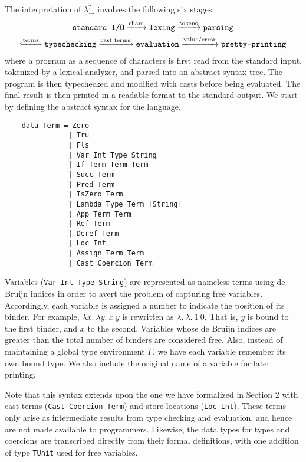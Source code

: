 The interpretation of $\lambda ^? _{\rightarrow}$ involves the following 
six stages:
\begin{gather*}
    \texttt{standard I/O} \xrightarrow{\text{chars}}
    \texttt{lexing} \xrightarrow{\text{tokens}} \texttt{parsing} \\
    \lhook\joinrel\xrightarrow{\text{terms}} \texttt{typechecking} 
    \xrightarrow{\text{cast terms}} \texttt{evaluation} 
    \xrightarrow{\text{value}/\text{error}} \texttt{pretty-printing}
\end{gather*}
where a program as a sequence of characters is first read from the 
standard input, tokenized by a lexical analyzer, and parsed into 
an abstract syntax tree. The program is then typechecked and 
modified with casts before being evaluated. The final 
result is then printed in a readable format to the standard output.  We start by 
defining the abstract syntax for the language.

\begin{lstlisting}
    data Term = Zero                       
               | Tru                        
               | Fls                        
               | Var Int Type String        
               | If Term Term Term          
               | Succ Term                   
               | Pred Term                  
               | IsZero Term                
               | Lambda Type Term [String]  
               | App Term Term              
               | Ref Term                   
               | Deref Term                 
               | Loc Int                    
               | Assign Term Term          
               | Cast Coercion Term   
\end{lstlisting}

Variables (\lstinline{Var Int Type String}) are represented as nameless terms using de Bruijn indices 
in order to avert the problem of capturing free variables. Accordingly, each variable 
is assigned a number to indicate the position of its binder. For example, 
$\lambda x. \: \lambda y. \: x \: y$ is rewritten as $\lambda. \: \lambda. 
\: 1 \: 0$. That is, $y$ is bound to the first binder, and $x$ to the second. 
Variables whose de Bruijn indices are greater than the total number of binders 
are considered free. Also, instead of maintaining a global type environment 
$\Gamma$, we have each variable remember its own bound type. We also 
include the original name of a variable for later printing.

Note that this syntax extends upon the one we have formalized in Section 2 
with cast terms (\lstinline{Cast Coercion Term}) and  
store locations (\lstinline{Loc Int}). These terms only arise as intermediate 
results from type checking and evaluation, and hence are not made available 
to programmers. Likewise, the data types for types and coercions are transcribed 
directly from their formal definitions, with one addition of type \lstinline{TUnit} 
used for free variables.

